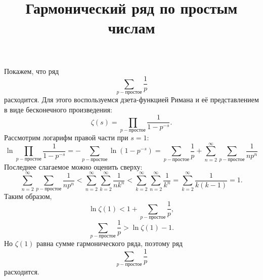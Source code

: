 
\title{Гармонический ряд по простым числам}

\maketitle
Покажем, что ряд
\begin{equation*}
    \sum_{p-\text{простое}}\frac{1}{p}
\end{equation*}
расходится. Для этого воспользуемся дзета-функцией Римана и её представлением в виде бесконечного произведения:
\begin{equation*}
    \zeta(s) = \prod_{p-\text{простое}}\frac{1}{1-p^{-s}}.
\end{equation*}
Рассмотрим логарифм правой части при \( s = 1 \):
\begin{equation*}
    \ln\prod_{p-\text{простое}}\frac{1}{1-p^{-s}} = -\sum_{p-\text{простое}}\ln\left(1-p^{-s}\right) = \sum_{p-\text{простое}}\frac{1}{p} + \sum_{n=2}^\infty\sum_{p-\text{простое}}\frac{1}{np^n}
\end{equation*}
Последнее слагаемое можно оценить сверху:
\begin{equation*}
    \sum_{n=2}^\infty\sum_{p-\text{простое}}\frac{1}{np^n} <
    \sum_{n=2}^\infty\sum_{k=2}^\infty\frac{1}{nk^n} <
    \sum_{k=2}^\infty\sum_{n=2}^\infty\frac{1}{k^n} =
    \sum_{k=2}^\infty\frac{1}{k(k-1)} = 1.
\end{equation*}
Таким образом,
\begin{equation*}
    \ln\zeta(1) < 1 + \sum_{p-\text{простое}}\frac{1}{p},
\end{equation*}
\begin{equation*}
    \sum_{p-\text{простое}}\frac{1}{p} > \ln\zeta(1) - 1.
\end{equation*}
Но \( \zeta(1) \) равна сумме гармонического ряда, поэтому ряд
\begin{equation*}
    \sum_{p-\text{простое}}\frac{1}{p}
\end{equation*}
расходится.
